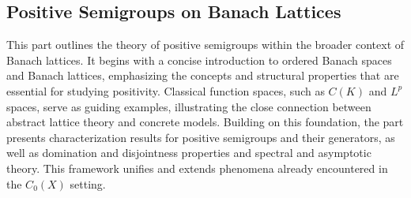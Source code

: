 \begin{partbacktext}
\part{Positive Semigroups on Banach Lattices}
This part outlines the theory of positive semigroups within the broader context of Banach lattices.
It begins with a concise introduction to ordered Banach spaces and Banach lattices, emphasizing the concepts and structural properties that are essential for studying positivity.
Classical function spaces, such as $C(K)$ and $L^{p}$ spaces, serve as guiding examples, illustrating the close connection between abstract lattice theory and concrete models.
Building on this foundation, the part presents characterization results for positive semigroups and their generators, as well as domination and disjointness properties and spectral and asymptotic theory.
This framework unifies and extends phenomena already encountered in the $C_{0}(X)$ setting.
\end{partbacktext}
